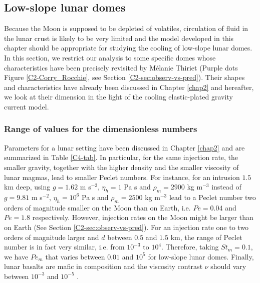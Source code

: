 \subsection{Low-slope lunar domes}
\label{sec:appl-arrest-terr-1}

Because the Moon is supposed  to be depleted of volatiles, circulation
of fluid in the lunar crust is likely to be very limited and the model
developed  in this  chapter  should be  appropriate  for studying  the
cooling of  low-slope lunar domes.   In this section, we  restrict our
analysis  to  some  specific  domes whose  characteristics  have  been
precisely   revisited  by   Mélanie   Thiriet   (Purple  dots   Figure
\ref{C2-Corry_Rocchie},   see  Section   \ref{C2-sec:observ-vs-pred}).
Their  shapes  and  characteristics  have already  been  discussed  in
Chapter \ref{chap2} and  hereafter, we look at their  dimension in the
light of the cooling elastic-plated gravity current model.

\subsubsection*{Range of values for the dimensionless numbers}
\label{C4-sec:range-valu-dimens}

Parameters  for  a  lunar  setting  have  been  discussed  in  Chapter
\ref{chap2} and are summarized  in Table \ref{C4-tab}.  In particular,
for the  same injection rate,  the smaller gravity, together  with the
higher  density and  the smaller  viscosity of  lunar magmas,  lead to
smaller Peclet numbers.  For instance, for an intrusion $1.5$ km deep,
using  $g=1.62$  m s$^{-2}$,  $\eta_h=1$  Pa  s and  $\rho_m=2900$  kg
m$^{-3}$  instead  of $g=9.81$  m  s$^{-2}$,  $\eta_h=10^6$ Pa  s  and
$\rho_m=2500$  kg m$^{-3}$  lead  to  a Peclet  number  two orders  of
magnitude  smaller on  the Moon  than  on Earth,  i.e.  $Pe=0.04$  and
$Pe=1.8$ respectively.  However, injection rates  on the Moon might be
larger  than   on  Earth   \citep{Crisp:1990gf,Zimbelman:1998ww}  (See
Section \ref{C2-sec:observ-vs-pred}).   For an  injection rate  one to
two orders of magnitude larger and $d$ between $0.5$ and $1.5$ km, the
range of Peclet  number is in fact very similar,  i.e.  from $10^{-3}$
to $10^4$.  Therefore,  taking $St_m=0.1$, we have  $Pe_m$ that varies
between $0.01$ and  $10^5$ for low-slope lunar  domes.  Finally, lunar
basalts  are mafic  in composition  and the  viscosity contrast  $\nu$
should vary between $10^{-3}$ and $10^{-5}$ \citep{Diniega:2013eh}.

